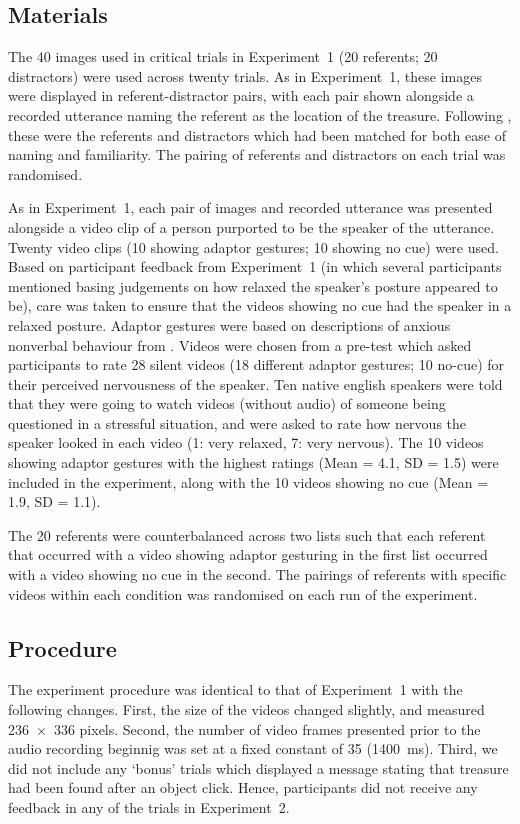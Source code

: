 \documentclass[a4paper,man,natbib]{apa6}
\begin{document}
\subsection{Materials}
The 40 images used in critical trials in Experiment~1 (20 referents; 20 distractors) were used across twenty trials.
As in Experiment~1, these images were displayed in referent-distractor pairs, with each pair shown alongside a recorded utterance naming the referent as the location of the treasure.
Following \citet{Loy2017}, these were the referents and distractors which had been matched for both ease of naming and familiarity.
The pairing of referents and distractors on each trial was randomised.

As in Experiment~1, each pair of images and recorded utterance was presented alongside a video clip of a person purported to be the speaker of the utterance.
Twenty video clips (10 showing adaptor gestures; 10 showing no cue) were used. 
Based on participant feedback from Experiment~1 (in which several participants mentioned basing judgements on how relaxed the speaker's posture appeared to be), care was taken to ensure that the videos showing no cue had the speaker in a relaxed posture. 
Adaptor gestures were based on descriptions of anxious nonverbal behaviour from \citet{Gregersen2005}.
Videos were chosen from a pre-test which asked participants to rate 28 silent videos (18 different adaptor gestures; 10 no-cue) for their perceived nervousness of the speaker. 
Ten native english speakers were told that they were going to watch videos (without audio) of someone being questioned in a stressful situation, and were asked to rate how nervous the speaker looked in each video (1: very relaxed, 7: very nervous). 
The 10 videos showing adaptor gestures with the highest ratings (Mean = 4.1, SD = 1.5) were included in the experiment, along with the 10 videos showing no cue (Mean = 1.9, SD = 1.1).

The 20 referents were counterbalanced across two lists such that each referent that occurred with a video showing adaptor gesturing in the first list occurred with a video showing no cue in the second.
The pairings of referents with specific videos within each condition was randomised on each run of the experiment.

\subsection{Procedure}
The experiment procedure was identical to that of Experiment~1 with the following changes.
First, the size of the videos changed slightly, and measured 236~$\times$~336 pixels.
Second, the number of video frames presented prior to the audio recording beginnig was set at a fixed constant of 35 (1400~ms).
Third, we did not include any `bonus' trials which displayed a message stating that treasure had been found after an object click.
Hence, participants did not receive any feedback in any of the trials in Experiment~2.
\end{document}
